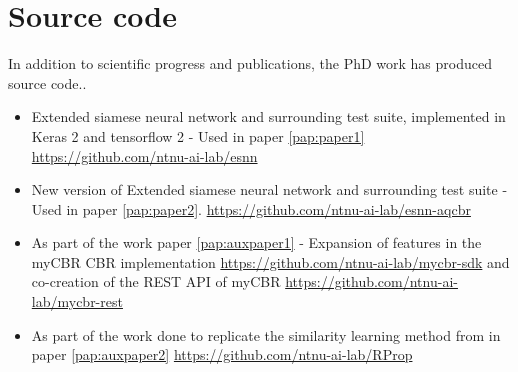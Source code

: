 \section{Source code}
\label{sec:othercontrib}
In addition to scientific progress and publications, the PhD work has produced
source code..
\lipsum[6-7]


\label{sec:othercontrib:sourcecode}
\begin{itemize}
\item Extended siamese neural network and surrounding test suite, implemented in
  Keras 2 and tensorflow 2 - Used in paper \cref{pap:paper1}\newline
  \url{https://github.com/ntnu-ai-lab/esnn}
\item New version of Extended siamese neural network and surrounding test suite
  - Used in paper \cref{pap:paper2}.\newline
  \url{https://github.com/ntnu-ai-lab/esnn-aqcbr}
\item As part of the work paper \cref{pap:auxpaper1} - Expansion of features in the
  myCBR CBR implementation \url{https://github.com/ntnu-ai-lab/mycbr-sdk} and
  co-creation of the REST API of myCBR
  \url{https://github.com/ntnu-ai-lab/mycbr-rest}
\item As part of the work done to replicate the similarity learning method from 
  in paper \cref{pap:auxpaper2} \url{https://github.com/ntnu-ai-lab/RProp}
\end{itemize}


